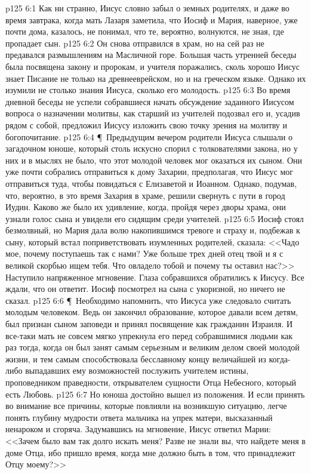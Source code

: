 \vs p125 6:1 Как ни странно, Иисус словно забыл о земных родителях, и даже во время завтрака, когда мать Лазаря заметила, что Иосиф и Мария, наверное, уже почти дома, казалось, не понимал, что те, вероятно, волнуются, не зная, где пропадает сын.
\vs p125 6:2 Он снова отправился в храм, но на сей раз не предавался размышлениям на Масличной горе. Большая часть утренней беседы была посвящена закону и пророкам, и учителя поражались, сколь хорошо Иисус знает Писание не только на древнееврейском, но и на греческом языке. Однако их изумили не столько знания Иисуса, сколько его молодость.
\vs p125 6:3 Во время дневной беседы не успели собравшиеся начать обсуждение заданного Иисусом вопроса о назначении молитвы, как старший из учителей подозвал его и, усадив рядом с собой, предложил Иисусу изложить свою точку зрения на молитву и богопочитание.
\vs p125 6:4 \P\ Предыдущим вечером родители Иисуса слышали о загадочном юноше, который столь искусно спорил с толкователями закона, но у них и в мыслях не было, что этот молодой человек мог оказаться их сыном. Они уже почти собрались отправиться к дому Захарии, предполагая, что Иисус мог отправиться туда, чтобы повидаться с Елизаветой и Иоанном. Однако, подумав, что, вероятно, в это время Захария в храме, решили свернуть с пути в город Иудин. Каково же было их удивление, когда, пройдя через дворы храма, они узнали голос сына и увидели его сидящим среди учителей.
\vs p125 6:5 Иосиф стоял безмолвный, но Мария дала волю накопившимся тревоге и страху и, подбежав к сыну, который встал поприветствовать изумленных родителей, сказала: <<Чадо мое, почему поступаешь так с нами? Уже больше трех дней отец твой и я с великой скорбью ищем тебя. Что овладело тобой и почему ты оставил нас?>> Наступило напряженное мгновение. Глаза собравшихся обратились к Иисусу. Все ждали, что он ответит. Иосиф посмотрел на сына с укоризной, но ничего не сказал.
\vs p125 6:6 \P\ Необходимо напомнить, что Иисуса уже следовало считать молодым человеком. Ведь он закончил образование, которое давали всем детям, был признан сыном заповеди и принял посвящение как гражданин Израиля. И все\hyp{}таки мать не совсем мягко упрекнула его перед собравшимися людьми как раз тогда, когда он был занят самым серьезным и великим делом своей молодой жизни, и тем самым способствовала бесславному концу величайшей из когда\hyp{}либо выпадавших ему возможностей послужить учителем истины, проповедником праведности, открывателем сущности Отца Небесного, который есть Любовь.
\vs p125 6:7 Но юноша достойно вышел из положения. И если принять во внимание все причины, которые повлияли на возникшую ситуацию, легче понять глубину мудрости ответа мальчика на упрек матери, высказанный ненароком и сгоряча. Задумавшись на мгновение, Иисус ответил Марии: <<Зачем было вам так долго искать меня? Разве не знали вы, что найдете меня в доме Отца, ибо пришло время, когда мне должно быть в том, что принадлежит Отцу моему?>>
